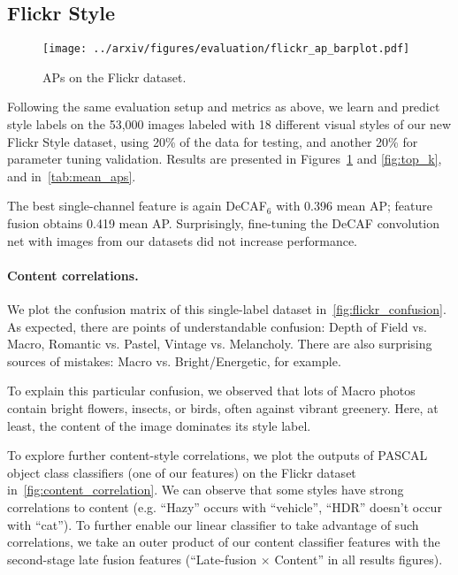 \subsection{Flickr Style}

\begin{figure}
\centering
\texttt{[image: ../arxiv/figures/evaluation/flickr\_ap\_barplot.pdf]}
\caption{APs on the Flickr dataset.}
\label{fig:flickr_results}
\end{figure}

Following the same evaluation setup and metrics as above, we learn and predict style labels on the 53,000 images labeled with 18 different visual styles of our new Flickr Style dataset, using 20\% of the data for testing, and another 20\% for parameter tuning validation.
Results are presented in Figures~\ref{fig:flickr_results} and \ref{fig:top_k}, and in~\autoref{tab:mean_aps}.

The best single-channel feature is again DeCAF$_6$ with 0.396 mean AP; feature fusion obtains 0.419 mean AP.
Surprisingly, fine-tuning the DeCAF convolution net with images from our datasets did not increase performance.

\vspace{-.5em}
\paragraph{Content correlations.}
We plot the confusion matrix of this single-label dataset in~\autoref{fig:flickr_confusion}.
As expected, there are points of understandable confusion: Depth of Field vs. Macro, Romantic vs. Pastel, Vintage vs. Melancholy.
There are also surprising sources of mistakes: Macro vs. Bright/Energetic, for example.

To explain this particular confusion, we observed that lots of Macro photos contain bright flowers, insects, or birds, often against vibrant greenery.
Here, at least, the content of the image dominates its style label.

To explore further content-style correlations, we plot the outputs of PASCAL object class classifiers (one of our features) on the Flickr dataset in~\autoref{fig:content_correlation}.
We can observe that some styles have strong correlations to content (e.g. ``Hazy'' occurs with ``vehicle'', ``HDR'' doesn't occur with ``cat'').
To further enable our linear classifier to take advantage of such correlations, we take an outer product of our content classifier features with the second-stage late fusion features (``Late-fusion $\times$ Content'' in all results figures).

